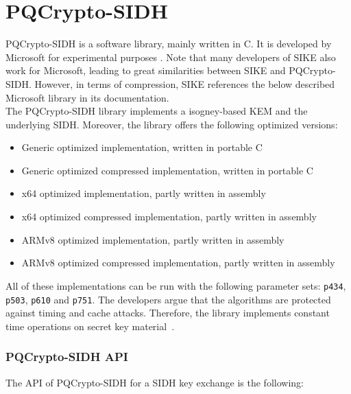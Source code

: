 \section{\gls{PQCrypto-SIDH}}
\gls{PQCrypto-SIDH} is a software library, mainly written in C. It is developed by Microsoft for experimental purposes \parencite{microsoft2020sidh}. Note that many developers of \gls{SIKE} also work for Microsoft, leading to great similarities between \gls{SIKE} and \gls{PQCrypto-SIDH}. However, in terms of compression, \gls{SIKE} references the below described Microsoft library in its documentation.\\
The \gls{PQCrypto-SIDH} library implements a isogney-based \gls{KEM} and the underlying \gls{SIDH}. Moreover, the library offers the following optimized versions:
\begin{itemize}
  \item Generic optimized implementation, written in portable C
  \item Generic optimized compressed implementation, written in portable C
  \item x64 optimized implementation, partly written in assembly
  \item x64 optimized compressed implementation, partly written in assembly
  \item ARMv8 optimized implementation, partly written in assembly
  \item ARMv8 optimized compressed implementation, partly written in assembly
\end{itemize}
All of these implementations can be run with the following parameter sets: \texttt{p434}, \texttt{p503}, \texttt{p610} and \texttt{p751}. The developers argue that the algorithms are protected against timing and cache attacks. Therefore, the library implements constant time operations on secret key material~\parencite{microsoft2020sidh}.
\subsubsection{\gls{PQCrypto-SIDH} API}
The API of \gls{PQCrypto-SIDH} for a \gls{SIDH} key exchange is the following:

